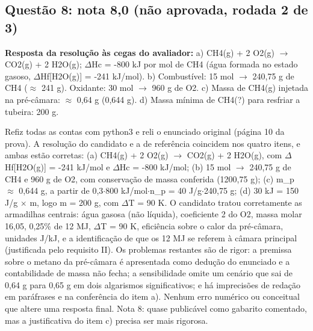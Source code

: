 \documentclass{article}%
\begin{document}
\subsection*{Questão 8: nota 8,0 (não aprovada, rodada 2 de 3)}%
\textbf{Resposta da resolução às cegas do avaliador:} a) CH4(g) + 2 O2(g) $\to$ CO2(g) + 2 H2O(g); $\Delta$Hc = -800 kJ por mol de CH4 (água formada no estado gasoso, $\Delta$Hf{[}H2O(g){]} = -241 kJ/mol).\newline%
b) Combustível: 15 mol $\to$ 240,75 g de CH4 ($\approx$ 241 g). Oxidante: 30 mol $\to$ 960 g de O2.\newline%
c) Massa de CH4(g) injetada na pré{-}câmara: $\approx$ 0,64 g (0,644 g).\newline%
d) Massa mínima de CH4(?) para resfriar a tubeira: 200 g.\par %
Refiz todas as contas com python3 e reli o enunciado original (página 10 da prova). A resolução do candidato e a de referência coincidem nos quatro itens, e ambas estão corretas: (a) CH4(g) + 2 O2(g) $\to$ CO2(g) + 2 H2O(g), com $\Delta$Hf{[}H2O(g){]} = -241 kJ/mol e $\Delta$Hc = -800 kJ/mol; (b) 15 mol $\to$ 240,75 g de CH4 e 960 g de O2, com conservação de massa conferida (1200,75 g); (c) m\_p $\approx$ 0,644 g, a partir de 0,3$\cdot$800 kJ/mol$\cdot$n\_p = 40 J/g$\cdot$240,75 g; (d) 30 kJ = 150 J/g $\times$ m, logo m = 200 g, com $\Delta$T = 90 K. O candidato tratou corretamente as armadilhas centrais: água gasosa (não líquida), coeficiente 2 do O2, massa molar 16,05, 0,25\% de 12 MJ, $\Delta$T = 90 K, eficiência sobre o calor da pré{-}câmara, unidades J/kJ, e a identificação de que os 12 MJ se referem à câmara principal (justificada pelo requisito II). Os problemas restantes são de rigor: a premissa sobre o metano da pré{-}câmara é apresentada como dedução do enunciado e a contabilidade de massa não fecha; a sensibilidade omite um cenário que sai de 0,64 g para 0,65 g em dois algarismos significativos; e há imprecisões de redação em paráfrases e na conferência do item a). Nenhum erro numérico ou conceitual que altere uma resposta final. Nota 8: quase publicável como gabarito comentado, mas a justificativa do item c) precisa ser mais rigorosa.%
\end{document}
